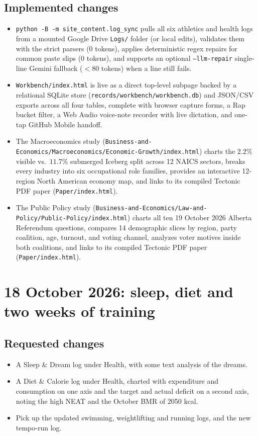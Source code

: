 \documentclass[11pt]{article}
\begin{document}
\subsection{Implemented changes}
\begin{itemize}
\item \texttt{python -B -m site\_content.log\_sync} pulls all six athletics and health logs from a mounted Google Drive \texttt{Logs/} folder (or local edits), validates them with the strict parsers (0 tokens), applies deterministic regex repairs for common paste slips (0 tokens), and supports an optional \texttt{--llm-repair} single-line Gemini fallback ($<80$ tokens) when a line still fails.
\item \texttt{Workbench/index.html} is live as a direct top-level subpage backed by a relational SQLite store (\texttt{records/workbench/workbench.db}) and JSON/CSV exports across all four tables, complete with browser capture forms, a Rap bucket filter, a Web Audio voice-note recorder with live dictation, and one-tap GitHub Mobile handoff.
\item The Macroeconomics study (\texttt{Business-and-Economics/Macroeconomics/Economic-Growth/index.html}) charts the $2.2\%$ visible vs.\ $11.7\%$ submerged Iceberg split across 12 NAICS sectors, breaks every industry into six occupational role families, provides an interactive 12-region North American economy map, and links to its compiled Tectonic PDF paper (\texttt{Paper/index.html}).
\item The Public Policy study (\texttt{Business-and-Economics/Law-and-Policy/Public-Policy/index.html}) charts all ten 19 October 2026 Alberta Referendum questions, compares 14 demographic slices by region, party coalition, age, turnout, and voting channel, analyzes voter motives inside both coalitions, and links to its compiled Tectonic PDF paper (\texttt{Paper/index.html}).
\end{itemize}

\section{18 October 2026: sleep, diet and two weeks of training}
\subsection{Requested changes}
\begin{itemize}
\item A Sleep \& Dream log under Health, with some text analysis of the dreams.
\item A Diet \& Calorie log under Health, charted with expenditure and consumption on one axis and the target and actual deficit on a second axis, noting the high NEAT and the October BMR of 2050 kcal.
\item Pick up the updated swimming, weightlifting and running logs, and the new tempo-run log.
\end{itemize}
\end{document}
